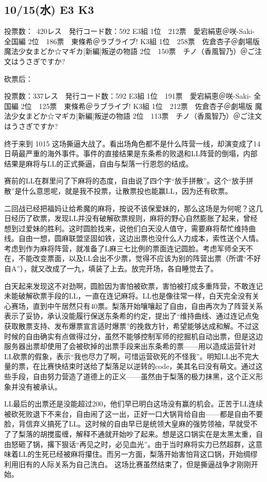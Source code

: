 \subsection{10/15(水) E3 K3}

    投票数：~420レス　発行コード数：592
    E3組
    1位　212票　愛宕絹恵＠咲-Saki- 全国編
    2位　186票　東條希＠ラブライブ!
    K3組
    1位　258票　佐倉杏子＠劇場版 魔法少女まどか☆マギカ[新編]叛逆の物語
    2位　150票　チノ（香風智乃）＠ご注文はうさぎですか?

砍票后：

    投票数：337レス　発行コード数：592
    E3組
    1位　191票　愛宕絹恵＠咲-Saki- 全国編
    2位　125票　東條希＠ラブライブ!
    K3組
    1位　212票　佐倉杏子＠劇場版 魔法少女まどか☆マギカ[新編]叛逆の物語
    2位　113票　チノ（香風智乃）＠ご注文はうさぎですか?

终于来到 1015 这场撕逼大战了。看出场角色都不是什么阵营一线，却演变成了14日萌最严重的海外事件。事件的直接结果是东条希的败退和LL阵营的倒塌，内部结果是麻将与LL的正式撕逼，自由与梨落一行恩怨的结成。

赛前的LL在群里问了下麻将的态度，自由说了四个字“放手拼散”。这个“放手拼散”是什么意思呢，就是我不投票，让散票投也能赢LL，因为还有砍票。

二回战已经把福妈让给希魔的麻将，按说不该保爱妹的，那么这场是为何呢？这几日经历了砍票，发现LL并没有破解砍票规则，麻将的野心自然膨胀了起来，曾经想到过爱妹的胜利。这时圆脸找来，说他们白天没人值守，需要麻将帮忙维持曲线。自由一想，圆麻联盟坚固如铁，这边出票也没什么人力成本，索性送个人情。考虑到作为麻将阵营，就准备了L麻三七比例的票面连记圆脸。考虑军师全天不在，不能改变票面，以及LL会出不少票，觉得不应该为别的阵营出票（所谓“不好自A”），就又改成了一九，填装了上去。放完开场，各自睡觉去了。

白天起来发现这不对劲啊，圆脸因为害怕被砍票，害怕被打成多重阵营，不敢连记未能破解砍票手段的LL，一直在连记麻将。LL也是像往常一样，白天完全没有关心赛场，直到中午居然只有40票。梨落开始嚷嚷起了自由，自由再次为了阵营关系表示了妥协，承认没能履行保送东条希的约定，提出了“维持曲线、通过连记点兔获取散票支持、发布爆票宣言适时爆票”的挽救方针，希望能够达成和解。不过这时候的自由确实有点做得过分，虽然不能够控制军师的挖掘机自动出票，但是这边服务器出票却使用了会被砍掉的出票手段来出东条希的票——用以造成运营针对LL砍票的假象，表示“我也尽力了啊，可惜运营砍死的不怪我”。明知LL出不完大量的票，在比赛快结束时送给了梨落足以逆转的code，美其名曰没有萌文。通过这些手段，自由努力营造了道德上的正义——虽然由于梨落的极力抹黑，这个正义形象并没有被承认。

LL最后的出票还是没能超过200，他们早已明白这场没有赢的机会。正苦于LL连续被砍死败退下不来台，自由闹了这一出，正好一口大锅背给自由——都是自由不要脸，背信弃义搞死了LL。这时候的自由早已是统领大皇麻的强势领袖，早就受不了了梨落的胡搅蛮缠，解释不通就开始吵了起来。想是这口锅实在是太黑太重，自由怒砸了锅，撂下狠话“再见之时，必见血光”。由于当时麻将实力已然超群，这意味着LL的生死已经被麻将攥住。而另一方面，梨落开始害怕背这口锅，开始绸缪利用旧有的人际关系为自己洗白。
这场比赛虽然结束了，但是撕逼战争才刚刚开始。

